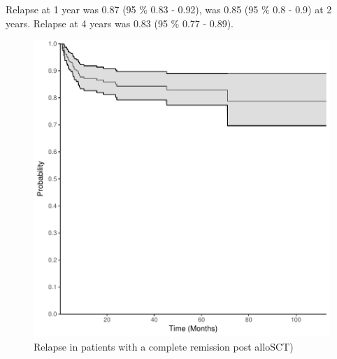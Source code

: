 \documentclass[a4paper,11pt] {article}
\begin{document}
\pagebreak
Relapse at 1 year was 0.87 (95 \% 0.83 - 0.92), was 0.85 (95 \% 0.8 - 0.9) at 2 years. Relapse at 4 years was 0.83 (95 \% 0.77 - 0.89).
\begin{figure}[h]
\begin{center}
\includegraphics{Rapport-fig4}
\end{center}
\caption{Relapse in patients with a complete remission post alloSCT)}
\label{fig4}
\end{figure}
\end{document}
